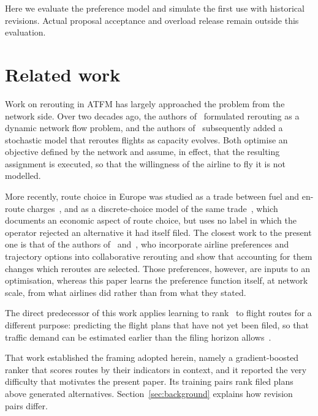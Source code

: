 \documentclass[a4paper,conference]{IEEEtran}
\begin{document}
Here we evaluate the preference model and simulate the first use with
historical revisions. Actual proposal acceptance and overload release remain outside this
evaluation.

\section{Related work} \label{sec:related}

Work on rerouting in ATFM has largely approached the
problem from the network side. Over two decades ago, the authors of~\cite{bertsimas2000} formulated
rerouting as a dynamic network flow problem, and the authors
of~\cite{mukherjee2009} subsequently added a stochastic model that reroutes
flights as capacity evolves. Both optimise an objective defined by the
network and assume, in effect, that the resulting assignment is executed, so
that the willingness of the airline to fly it is not modelled.

More recently, route choice in Europe was studied as a trade between
fuel and en-route charges~\cite{delgado2015}, and as a discrete-choice
model of the same trade~\cite{sha2015}, which documents an economic aspect of route choice, but uses no label in which the
operator rejected an alternative it had itself filed. The closest work to the present one is that of the authors
of~\cite{murca2018} and~\cite{xu2020framework}, who incorporate airline
preferences and trajectory options into collaborative rerouting and show
that accounting for them changes which reroutes are selected. Those preferences, however, are inputs to an optimisation,
whereas this paper learns the preference function itself, at network scale,
from what airlines did rather than from what they stated.

The direct predecessor of this work applies learning to rank~\cite{liu2009} to
flight routes for a different purpose: predicting the flight plans that have not
yet been
filed, so that traffic demand can be estimated earlier than the filing horizon
allows~\cite{dalmau2024}. 

That work established the framing adopted herein, namely a gradient-boosted
ranker that scores routes by their indicators in context, and it reported
the very difficulty that motivates the present paper. Its training pairs rank filed plans above generated alternatives.
Section~\ref{sec:background} explains how revision pairs differ.
\end{document}

